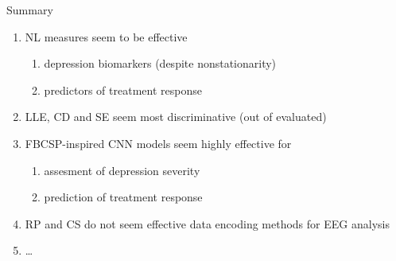 \documentclass{beamer}
\begin{document}
\begin{frame}{Summary}
    \centering
    \begin{enumerate}
        \item<1-> NL measures seem to be effective
          \begin{enumerate}
            \item depression biomarkers {\scriptsize(despite nonstationarity)}
            \item predictors of treatment response 
          \end{enumerate}
        \item<2-> LLE, CD and SE seem most discriminative {\scriptsize (out of evaluated)}
        \item<3-> FBCSP-inspired CNN models seem highly effective for
          \begin{enumerate}
            \item assesment of depression severity
            \item prediction of treatment response
          \end{enumerate}
        \item<4-> {\scriptsize RP and CS do not seem effective data encoding methods for EEG analysis}
        \item<4-> {\scriptsize \dots}
    \end{enumerate}
    
\end{frame}


\end{document}
